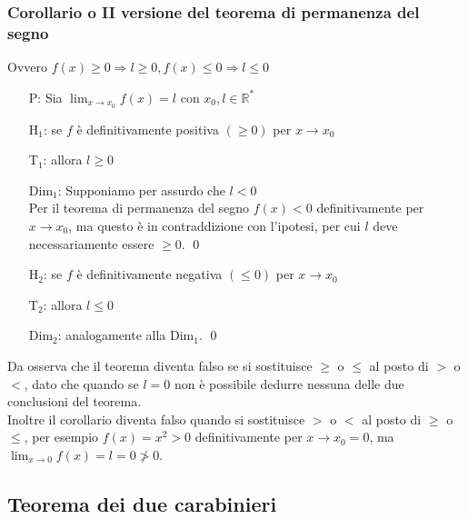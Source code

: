\documentclass[a4paper]{article}
\begin{document}
\subsubsection*{Corollario o II versione del teorema di permanenza del segno}
Ovvero \(f(x) \geq 0 \Rightarrow l \geq 0, f(x) \leq 0 \Rightarrow l \leq 0\)
\begin{itemize}
	\item[P:] Sia \(\displaystyle \lim_{x \to x_0} f(x) = l\) con \(x_0, l \in \mathbb{R}^*\)
	\item[H\(_1\):] se \(f\) è definitivamente positiva \(\left( \geq 0 \right)\) per \(x \to x_0\)
	\item[T\(_1\):] allora \(l \geq 0\)
	\item[Dim\(_1\):] Supponiamo per assurdo che \(l < 0\) \\
	Per il teorema di permanenza del segno \(f(x) < 0\) definitivamente per \(x \to x_0\), ma questo è in contraddizione con l'ipotesi,
	per cui \(l\) deve necessariamente essere \(\geq 0\). \qed

	\item[H\(_2\):] se \(f\) è definitivamente negativa \(\left( \leq 0 \right)\) per \(x \to x_0\)
	\item[T\(_2\):] allora \(l \leq 0\)
	\item[Dim\(_2\):] analogamente alla Dim\(_1\). \qed
\end{itemize}
Da osserva che il teorema diventa falso se si sostituisce \(\geq\) o \(\leq\) al posto di \(>\) o \(<\), dato che quando se \(l = 0\) non è possibile dedurre nessuna delle due conclusioni del teorema. \\
Inoltre il corollario diventa falso quando si sostituisce \(>\) o \(<\) al posto di \(\geq\) o \(\leq\), per esempio \(f(x) = x^2 > 0\) definitivamente per \(x \to x_0 = 0\), ma \(\displaystyle \lim_{x \to 0} f(x) = l = 0 \ngtr 0\).

\newpage


\subsection{Teorema dei due carabinieri}
\end{document}
